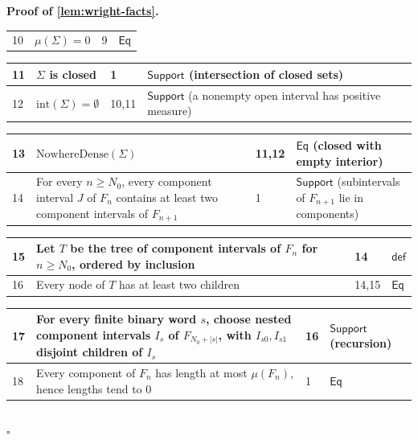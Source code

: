 \documentclass[11pt,reqno]{amsart}
\theoremstyle{blueplain}
\renewcommand{\qedsymbol}{\textcolor{proofqed}{\ensuremath{\square}}}
\renewenvironment{proof}[1][Proof]{\par\noindent\textbf{\textcolor{proofhead}{#1.}}\par\nobreak}{\par\nobreak\hfill\qedsymbol}
\numberwithin{equation}{section}
\begin{document}
\begin{proof}[\textbf{Proof of \cref{lem:wright-facts}}]
{\begin{tabular}{|m{0.7cm}|m{12cm}|m{1.4cm}|m{2.5cm}|}
			10 & \(\mu(\Sigma)=0\) & 9 & \(\mathsf{Eq}\) \\
		\end{tabular}%
		\noindent \newline
		\noindent
		\begin{tabular}{|m{0.7cm}|m{12cm}|m{1.4cm}|m{2.5cm}|}
			\hline
			11 & \(\Sigma\) is closed & 1 & \(\mathsf{Support}\) (intersection of closed sets) \\ \hline
			12 & \(\mathrm{int}(\Sigma)=\emptyset\) & 10,11 & \(\mathsf{Support}\) (a nonempty open interval has positive measure) \\
		\end{tabular}%
		\noindent \newline
		\noindent
		\begin{tabular}{|m{0.7cm}|m{12cm}|m{1.4cm}|m{2.5cm}|}
			\hline
			13 & \(\mathrm{NowhereDense}(\Sigma)\) & 11,12 & \(\mathsf{Eq}\) (closed with empty interior) \\ \hline
			14 & For every \(n\ge N_0\), every component interval \(J\) of \(F_n\) contains at least two component intervals of \(F_{n+1}\) & 1 & \(\mathsf{Support}\) (subintervals of \(F_{n+1}\) lie in components) \\
		\end{tabular}%
		\noindent \newline
		\noindent
		\begin{tabular}{|m{0.7cm}|m{12cm}|m{1.4cm}|m{2.5cm}|}
			\hline
			15 & Let \(T\) be the tree of component intervals of \(F_n\) for \(n\ge N_0\), ordered by inclusion & 14 & \(\mathsf{def}\) \\ \hline
			16 & Every node of \(T\) has at least two children & 14,15 & \(\mathsf{Eq}\) \\
		\end{tabular}%
		\noindent \newline
		\noindent
		\begin{tabular}{|m{0.7cm}|m{12cm}|m{1.4cm}|m{2.5cm}|}
			\hline
			17 & For every finite binary word \(s\), choose nested component intervals \(I_s\) of \(F_{N_0+|s|}\), with \(I_{s0},I_{s1}\) disjoint children of \(I_s\) & 16 & \(\mathsf{Support}\) (recursion) \\ \hline
			18 & Every component of \(F_n\) has length at most \(\mu(F_n)\), hence lengths tend to \(0\) & 1 & \(\mathsf{Eq}\) \\
		\end{tabular}%
		\noindent \newline
		\noindent
		\begin{tabular}{|m{0.7cm}|m{12cm}|m{1.4cm}|m{2.5cm}|}

\end{tabular}}
\end{proof}
\end{document}
